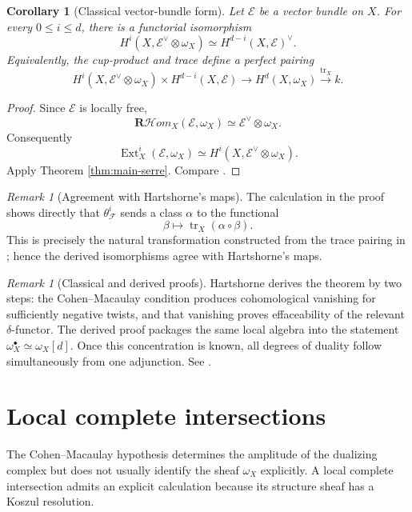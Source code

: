 \documentclass[11pt,a4paper]{article}
\newtheorem{corollary}[theorem]{Corollary}
\theoremstyle{definition}
\theoremstyle{remark}
\newtheorem{remark}[theorem]{Remark}
\newcommand{\FF}{\mathcal F}
\newcommand{\EE}{\mathcal E}
\newcommand{\Ext}{\operatorname{Ext}}
\newcommand{\RshHom}{\mathbf R\!\mathcal H\!om}
\newcommand{\tr}{\operatorname{tr}}
\newcommand{\dual}{^{\vee}}
\begin{document}
\begin{corollary}[Classical vector-bundle form]
\label{cor:vector-bundle-duality}
Let $\EE$ be a vector bundle on $X$. For every $0\leq i\leq d$, there is a
functorial isomorphism
\[
  H^i(X,\EE\dual\otimes\omega_X)
  \simeq H^{d-i}(X,\EE)\dual.
\]
Equivalently, the cup-product and trace define a perfect pairing
\[
  H^i(X,\EE\dual\otimes\omega_X)
  \times H^{d-i}(X,\EE)
  \longrightarrow H^d(X,\omega_X)
  \xrightarrow{\tr_X}k.
\]
\end{corollary}

\begin{proof}
Since $\EE$ is locally free,
\[
  \RshHom_X(\EE,\omega_X)
  \simeq\EE\dual\otimes\omega_X.
\]
Consequently
\[
  \Ext_X^i(\EE,\omega_X)
  \simeq H^i(X,\EE\dual\otimes\omega_X).
\]
Apply Theorem \ref{thm:main-serre}.  Compare
\cite[Chapter III, Corollary 7.7]{HartshorneAG}.
\end{proof}

\begin{remark}[Agreement with Hartshorne's maps]
The calculation in the proof shows directly that $\theta^i_{\FF}$ sends a
class $\alpha$ to the functional
\[
  \beta\longmapsto\tr_X(\alpha\circ\beta).
\]
This is precisely the natural transformation constructed from the trace
pairing in \cite[Chapter III, Theorem 7.6]{HartshorneAG}; hence the derived
isomorphisms agree with Hartshorne's maps.
\end{remark}

\begin{remark}[Classical and derived proofs]
Hartshorne derives the theorem by two steps: the Cohen--Macaulay condition
produces cohomological vanishing for sufficiently negative twists, and that
vanishing proves effaceability of the relevant $\delta$-functor.  The derived
proof packages the same local algebra into the statement
$\omega_X^\bullet\simeq\omega_X[d]$.  Once this concentration is known, all
degrees of duality follow simultaneously from one adjunction. See
\cite[Chapter III, proof of Theorem 7.6]{HartshorneAG}.
\end{remark}

\section{Local complete intersections}

The Cohen--Macaulay hypothesis determines the amplitude of the dualizing
complex but does not usually identify the sheaf $\omega_X$ explicitly.  A
local complete intersection admits an explicit calculation because its
structure sheaf has a Koszul resolution.
\end{document}
